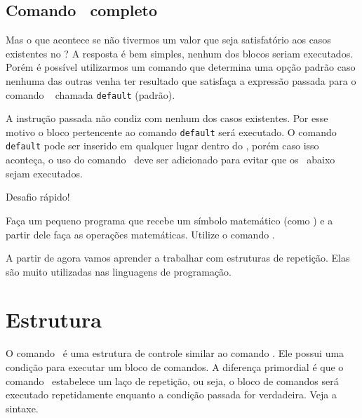 

\subsection{Comando \comandoswitch~completo}
\label{comando-switch-completo}

Mas o que acontece se não tivermos um valor que seja satisfatório aos casos 
existentes no \comandoswitch? A resposta é bem simples, nenhum dos blocos seriam executados.
Porém é possível utilizarmos um comando que determina uma opção padrão caso nenhuma das outras 
venha ter resultado que satisfaça a expressão passada para o comando \comandoswitch~ 
chamada \texttt{default} (padrão).



A instrução passada não condiz com nenhum dos casos existentes. Por esse motivo o bloco 
pertencente ao comando \texttt{default} será executado. O comando \texttt{default} pode ser 
inserido em qualquer lugar dentro do \comandoswitch, porém caso isso aconteça, 
o uso do comando \comandobreak~deve ser adicionado para evitar que os \comandocase~abaixo 
sejam executados.

\begin{framed}
{\Large Desafio rápido!}

Faça um pequeno programa que recebe um símbolo matemático (como \tipostring) e a partir dele
faça as operações matemáticas. Utilize o comando \comandoswitch.  
\end{framed}

A partir de agora vamos aprender a trabalhar com estruturas de repetição. 
Elas são muito utilizadas nas linguagens de programação.

\section{Estrutura \comandowhile}
\label{estrutura-while}

O comando \comandowhile~é uma estrutura de controle similar ao comando \comandoif. Ele possui 
uma condição para executar um bloco de comandos. A diferença primordial é que o comando 
\comandowhile~estabelece um laço de repetição, ou seja, o bloco de comandos será executado 
repetidamente enquanto a condição passada for verdadeira. Veja a sintaxe.



